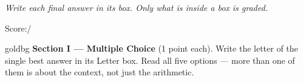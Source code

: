 \documentclass[12pt]{article}
\begin{document}
{\small\itshape Write each final answer in its box. Only what is inside a box is graded.}\par

\hfill\small Score:\;\blank{1.3cm}\;/\normalsize
\vspace{0.06in}

\boxguard[10]
\begin{headlinebox}{goldbg}
\small
\textbf{Section I --- Multiple Choice} (1 point each). Write the letter of the single best answer in its Letter box. Read all
five options --- more than one of them is about the context, not just the arithmetic.
\end{headlinebox}

\vspace{0.10in}
\end{document}
